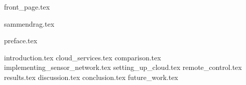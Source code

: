 \documentclass[usenames,dvipsnames, b5paper, twoside, openright]{report}
\begin{document}
%

{front_page.tex}


\setcounter{page}{1}
\setcounter{tocdepth}{3}


\let\cleardoublepage\clearpage
{sammendrag.tex}

\let\cleardoublepage\clearpage
{preface.tex}
\let\cleardoublepage\clearpage
\tableofcontents




\setcounter{page}{1}
\pagestyle{fancy}

\let\cleardoublepage\clearpage
{introduction.tex}
\let\cleardoublepage\clearpage
{cloud_services.tex}
\let\cleardoublepage\clearpage
{comparison.tex}
\let\cleardoublepage\clearpage
{implementing_sensor_network.tex}
\let\cleardoublepage\clearpage
{setting_up_cloud.tex}
\let\cleardoublepage\clearpage
{remote_control.tex}
\let\cleardoublepage\clearpage
{results.tex}
\let\cleardoublepage\clearpage
{discussion.tex}
\let\cleardoublepage\clearpage
{conclusion.tex}
\let\cleardoublepage\clearpage
{future_work.tex}

\let\cleardoublepage\clearpage

\begin{appendices}
\end{appendices}
\let\cleardoublepage\clearpage
{}
\let\cleardoublepage\clearpage

{}
\end{document}

